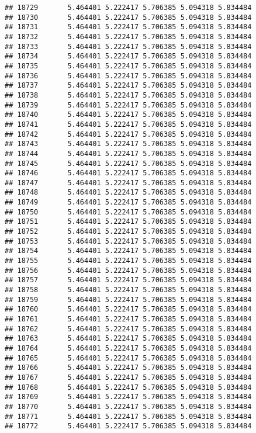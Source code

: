 \documentclass[
]{article}
\begin{document}
\begin{verbatim}
## 18729       5.464401 5.222417 5.706385 5.094318 5.834484
## 18730       5.464401 5.222417 5.706385 5.094318 5.834484
## 18731       5.464401 5.222417 5.706385 5.094318 5.834484
## 18732       5.464401 5.222417 5.706385 5.094318 5.834484
## 18733       5.464401 5.222417 5.706385 5.094318 5.834484
## 18734       5.464401 5.222417 5.706385 5.094318 5.834484
## 18735       5.464401 5.222417 5.706385 5.094318 5.834484
## 18736       5.464401 5.222417 5.706385 5.094318 5.834484
## 18737       5.464401 5.222417 5.706385 5.094318 5.834484
## 18738       5.464401 5.222417 5.706385 5.094318 5.834484
## 18739       5.464401 5.222417 5.706385 5.094318 5.834484
## 18740       5.464401 5.222417 5.706385 5.094318 5.834484
## 18741       5.464401 5.222417 5.706385 5.094318 5.834484
## 18742       5.464401 5.222417 5.706385 5.094318 5.834484
## 18743       5.464401 5.222417 5.706385 5.094318 5.834484
## 18744       5.464401 5.222417 5.706385 5.094318 5.834484
## 18745       5.464401 5.222417 5.706385 5.094318 5.834484
## 18746       5.464401 5.222417 5.706385 5.094318 5.834484
## 18747       5.464401 5.222417 5.706385 5.094318 5.834484
## 18748       5.464401 5.222417 5.706385 5.094318 5.834484
## 18749       5.464401 5.222417 5.706385 5.094318 5.834484
## 18750       5.464401 5.222417 5.706385 5.094318 5.834484
## 18751       5.464401 5.222417 5.706385 5.094318 5.834484
## 18752       5.464401 5.222417 5.706385 5.094318 5.834484
## 18753       5.464401 5.222417 5.706385 5.094318 5.834484
## 18754       5.464401 5.222417 5.706385 5.094318 5.834484
## 18755       5.464401 5.222417 5.706385 5.094318 5.834484
## 18756       5.464401 5.222417 5.706385 5.094318 5.834484
## 18757       5.464401 5.222417 5.706385 5.094318 5.834484
## 18758       5.464401 5.222417 5.706385 5.094318 5.834484
## 18759       5.464401 5.222417 5.706385 5.094318 5.834484
## 18760       5.464401 5.222417 5.706385 5.094318 5.834484
## 18761       5.464401 5.222417 5.706385 5.094318 5.834484
## 18762       5.464401 5.222417 5.706385 5.094318 5.834484
## 18763       5.464401 5.222417 5.706385 5.094318 5.834484
## 18764       5.464401 5.222417 5.706385 5.094318 5.834484
## 18765       5.464401 5.222417 5.706385 5.094318 5.834484
## 18766       5.464401 5.222417 5.706385 5.094318 5.834484
## 18767       5.464401 5.222417 5.706385 5.094318 5.834484
## 18768       5.464401 5.222417 5.706385 5.094318 5.834484
## 18769       5.464401 5.222417 5.706385 5.094318 5.834484
## 18770       5.464401 5.222417 5.706385 5.094318 5.834484
## 18771       5.464401 5.222417 5.706385 5.094318 5.834484
## 18772       5.464401 5.222417 5.706385 5.094318 5.834484

\end{verbatim}
\end{document}
